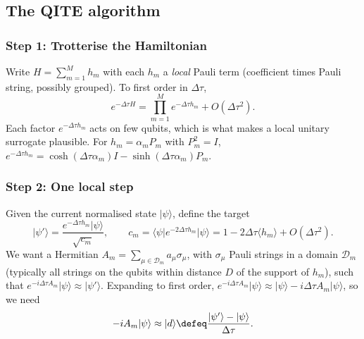 \documentclass[11pt,a4paper]{article}
\newcommand{\ket}[1]{\lvert #1\rangle}
\newcommand{\bra}[1]{\langle #1\rvert}
\newcommand{\expect}[1]{\langle #1\rangle}
\begin{document}
\subsection{The QITE algorithm}\label{sec:qite}

\subsubsection*{Step 1: Trotterise the Hamiltonian}
Write $H=\sum_{m=1}^{M}h_m$ with each $h_m$ a \emph{local} Pauli term (coefficient times
Pauli string, possibly grouped). To first order in $\Delta\tau$,
\begin{equation}\label{eq:trot}
  e^{-\Delta\tau H}=\prod_{m=1}^M e^{-\Delta\tau h_m}+O(\Delta\tau^2).
\end{equation}
Each factor $e^{-\Delta\tau h_m}$ acts on few qubits, which is what makes a local unitary
surrogate plausible. For $h_m=\alpha_m P_m$ with $P_m^2=I$,
$e^{-\Delta\tau h_m}=\cosh(\Delta\tau\alpha_m)I-\sinh(\Delta\tau\alpha_m)P_m$.

\subsubsection*{Step 2: One local step}
Given the current normalised state $\ket{\psi}$, define the target
\begin{equation}
  \ket{\psi'}=\frac{e^{-\Delta\tau h_m}\ket\psi}{\sqrt{c_m}},\qquad
  c_m=\bra\psi e^{-2\Delta\tau h_m}\ket\psi=1-2\Delta\tau\expect{h_m}+O(\Delta\tau^2).
\end{equation}
We want a Hermitian $A_m=\sum_{\mu\in\mathcal D_m}a_\mu\sigma_\mu$, with $\sigma_\mu$ Pauli strings
in a domain $\mathcal D_m$ (typically all strings on the qubits within distance $D$ of the support of $h_m$), such that
$e^{-i\Delta\tau A_m}\ket\psi\approx\ket{\psi'}$. Expanding to first order,
$e^{-i\Delta\tau A_m}\ket\psi\approx\ket\psi-i\Delta\tau A_m\ket\psi$, so we need
\begin{equation}
  -iA_m\ket\psi\approx\ket{d}\defeq\frac{\ket{\psi'}-\ket\psi}{\Delta\tau}.
\end{equation}
\end{document}
